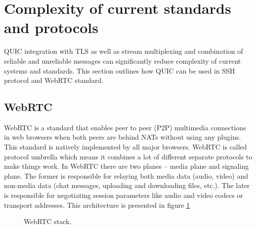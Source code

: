 \section{Complexity of current standards and protocols}
\label{sec:complexity_of_current_standards_and_protocols}
QUIC integration with TLS as well as stream multiplexing and combination of reliable and unreliable messages can significantly reduce complexity of current systems and standards.
This section outlines how QUIC can be used in SSH protocol and WebRTC standard.
\subsection{WebRTC}
WebRTC is a standard that enables peer to peer (P2P) multimedia connections in web browsers when both peers are behind NATs without using any plugins.
This standard is natively implemented by all major browsers.
WebRTC is called protocol umbrella which means it combines a lot of different separate protocols to make things work.
In WebRTC there are two planes -- media plane and signaling plane.
The former is responsible for relaying both media data (audio, video) and non-media data (chat messages, uploading and downloading files, etc.).
The later is responsible for negotiating session parameters like audio and video codecs or transport addresses.
This architecture is presented in figure \ref{fig:webrtc-stack}

\begin{figure}[h]
    \centering
    \caption{WebRTC stack.}
    \label{fig:webrtc-stack}
\end{figure}

